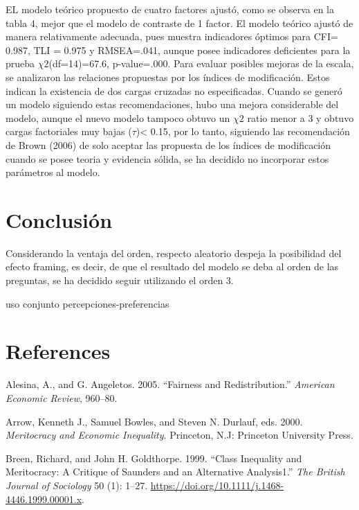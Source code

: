 \documentclass[
]{article}
\begin{document}
EL modelo teórico propuesto de cuatro factores ajustó, como se observa en la tabla 4, mejor que el modelo de contraste de 1 factor. El modelo teórico ajustó de manera relativamente adecuada, pues muestra indicadores óptimos para CFI= 0.987, TLI = 0.975 y RMSEA=.041, aunque posee indicadores deficientes para la prueba \(\chi2\)(df=14)=67.6, p-value=.000. Para evaluar posibles mejoras de la escala, se analizaron las relaciones propuestas por los índices de modificación. Estos indican la existencia de dos cargas cruzadas no especificadas. Cuando se generó un modelo siguiendo estas recomendaciones, hubo una mejora considerable del modelo, aunque el nuevo modelo tampoco obtuvo un \(\chi2\) ratio menor a 3 y obtuvo cargas factoriales muy bajas (\(\tau\))\textless{} 0.15, por lo tanto, siguiendo las recomendación de Brown (2006) de solo aceptar las propuesta de los índices de modificación cuando se posee teoria y evidencia sólida, se ha decidido no incorporar estos parámetros al modelo.

\hypertarget{conclusiuxf3n}{%
\section{Conclusión}\label{conclusiuxf3n}}

Considerando la ventaja del orden, respecto aleatorio despeja la posibilidad del efecto framing, es decir, de que el resultado del modelo se deba al orden de las preguntas, se ha decidido seguir utilizando el orden 3.

uso conjunto percepciones-preferencias

\pagebreak

\hypertarget{references}{%
\section{References}\label{references}}

\hypertarget{refs}{}
\leavevmode\hypertarget{ref-alesina_Fairness_2005}{}%
Alesina, A., and G. Angeletos. 2005. ``Fairness and Redistribution.'' \emph{American Economic Review}, 960--80.

\leavevmode\hypertarget{ref-arrow_meritocracy_2000}{}%
Arrow, Kenneth J., Samuel Bowles, and Steven N. Durlauf, eds. 2000. \emph{Meritocracy and Economic Inequality}. Princeton, N.J: Princeton University Press.

\leavevmode\hypertarget{ref-breenClassInequalityMeritocracy1999}{}%
Breen, Richard, and John H. Goldthorpe. 1999. ``Class Inequality and Meritocracy: A Critique of Saunders and an Alternative Analysis1.'' \emph{The British Journal of Sociology} 50 (1): 1--27. \url{https://doi.org/10.1111/j.1468-4446.1999.00001.x}.
\end{document}
